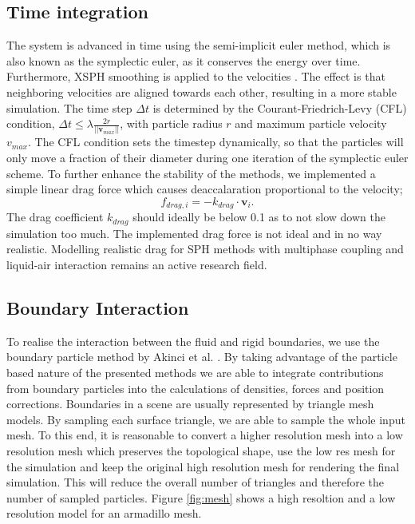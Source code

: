 \documentclass[11pt, letterpaper, twocolumn]{article}
\begin{document}
\subsection{Time integration}
The system is advanced in time using the semi-implicit euler method, which is also known as the symplectic euler, as it conserves the energy over time.
Furthermore, XSPH smoothing is applied to the velocities \cite{monaghan1989}.
The effect is that neighboring velocities are aligned towards each other, resulting in a more stable simulation.
The time step \(\Delta t\) is determined by the Courant-Friedrich-Levy (CFL) condition, \( \Delta t \leq \lambda \frac{2r}{||\mathbf{v}_{max}||}\), with particle radius \(r\) and maximum particle velocity \(v_{max}\). The CFL condition sets the timestep dynamically, so that the particles will only move a fraction of their diameter during one iteration of the symplectic euler scheme. 
To further enhance the stability of the methods, we implemented a simple linear drag force which causes deaccalaration proportional to the velocity;
\begin{equation}
  f_{drag,i} = -k_{drag} \cdot \mathbf{v}_i.
\end{equation}
The drag coefficient \(k_{drag}\) should ideally be below 0.1 as to not slow down the simulation too much. The implemented drag force is not ideal and in no way realistic. Modelling realistic drag for SPH methods with multiphase coupling and liquid-air interaction remains an active research field.

\subsection{Boundary Interaction}
To realise the interaction between the fluid and rigid boundaries, we use the boundary particle method by Akinci et al. \cite{akinci2012}. By taking advantage of the particle based nature of the presented methods we are able to integrate contributions from boundary particles into the calculations of densities, forces and position corrections.
Boundaries in a scene are usually represented by triangle mesh models. By sampling each surface triangle, we are able to sample the whole input mesh.
To this end, it is reasonable to convert a higher resolution mesh into a low resolution mesh which preserves the topological shape, use the low res mesh for the simulation and keep the original high resolution mesh for rendering the final simulation. This will reduce the overall number of triangles and therefore the number of sampled particles. Figure \ref{fig:mesh} shows a high resoltion and a low resolution model for an armadillo mesh.
\end{document}
